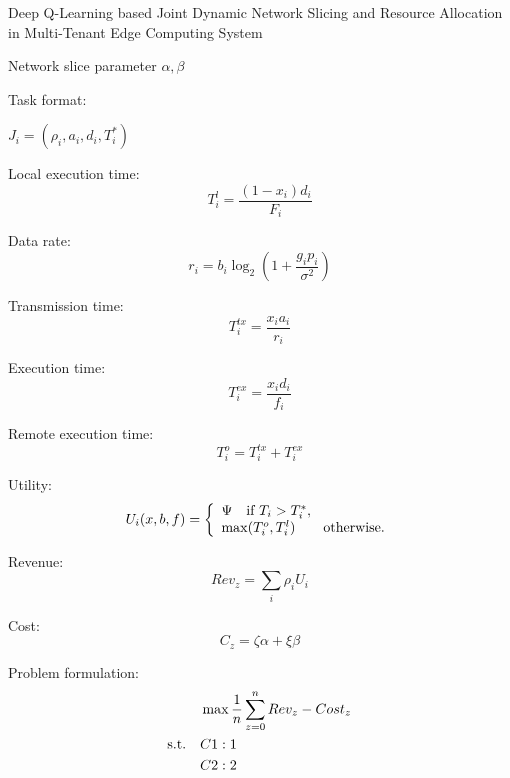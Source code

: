 \documentclass{article}
\begin{document}
Deep Q-Learning based Joint Dynamic Network Slicing and Resource Allocation in Multi-Tenant Edge Computing System

Network slice parameter
$\alpha, \beta$

Task format:

$J_{i}=(\rho_{i}, a_{i}, d_{i}, T_{i}^{*})$

Local execution time:
\begin{equation}
T_{i}^{l}=\frac{(1-x_{i})d_{i}}{F_{i}}
\end{equation}

Data rate:
\begin{equation}
r_{i}=b_{i}\log_{2}{ (1+\frac{g_{i}p_{i}}{ \sigma^{2} } ) }
\end{equation}

Transmission time:
\begin{equation}
T^{tx}_{i}=\frac{x_{i}a_{i}}{r_{i}}
\end{equation}

Execution time:
\begin{equation}
T^{ex}_{i}=\frac{x_{i}d_{i}}{f_{i}}
\end{equation}

Remote execution time:
\begin{equation}
T^{o}_{i}=T^{tx}_{i}+T^{ex}_{i}
\end{equation}

Utility:
\begin{equation}
U_{i}(x,b,f)=\left\{
	\begin{array}{ll}   
	\Psi \quad \mbox{if $ T_{i} > T_{i}^{*}$}, \\
    \max(T^{o}_{i},T^{l}_{i}) \qquad \mbox{otherwise.}
	\end{array}
\right.
\end{equation}

Revenue:
\begin{equation}
Rev_{z}=\sum_{i}\rho_{i}U_{i}
\end{equation}

Cost:
\begin{equation}
C_{z}=\zeta\alpha +\xi\beta
\end{equation}

Problem formulation:
\begin{align}\
& \max \frac{1}{n}\sum_{z=0}^{n} Rev_{z}-Cost_{z}  \nonumber\\
\rm{s.t.} \quad &C1: 1 \nonumber\\ 
\quad &C2: 2 \nonumber\\
\end{align}
\end{document}
